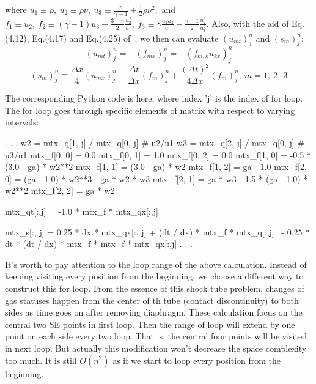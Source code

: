 \documentclass[a4paper,12pt]{article}
\begin{document}
where $u_{1}\equiv\rho,~u_{2}\equiv\rho\nu,~u_{3}\equiv\frac{p}{\gamma -1}
+\frac{1}{2}\rho\nu^{2},$ \newline
and $f_{1}\equiv u_{2},~f_{2}\equiv(\gamma -1)u_{3}+\frac{3-\gamma}{2}
\frac{u^{2}_{2}}{u_{1}},~f_{3}\equiv\gamma\frac{u_{2}u_{3}}{u_{1}}
-\frac{\gamma -1}{2}\frac{u^{3}_{2}}{u^{2}_{1}}$. \newline
Also, with the aid of Eq.(4.12), Eq.(4.17) and Eq.(4.25) 
of~\cite{CESE_Shin_Chung_Chang_1995}, we then can evaluate $(u_{mt})^{n}_{j}$ 
and $(s_{m})^{n}_{j}$:
\begin{equation}
(u_{mt})^{n}_{j} = -(f_{mx})^{n}_{j} = -(f_{m,k}u_{kx})^{n}_{j}
\end{equation}
\begin{equation}
(s_{m})^{n}_{j}\equiv\frac{\Delta x}{4}(u_{mx})^{n}_{j}+\frac{\Delta t}
{\Delta x}(f_{m})^{n}_{j}+\frac{(\Delta t)^{2}}{4\Delta x}(f_{m})^{n}_{j}
,~m=1,~2,~3
\end{equation}

The corresponding Python code is here, where index 'j' is the index of for loop. 
The for loop goes through specific elements of matrix with respect to varying 
intervals:
\begin{pythonNoIndex}
                            .
                            .
                            .
        w2 = mtx_q[1, j] / mtx_q[0, j]  # u2/u1
        w3 = mtx_q[2, j] / mtx_q[0, j]  # u3/u1
        mtx_f[0, 0] = 0.0
        mtx_f[0, 1] = 1.0
        mtx_f[0, 2] = 0.0
        mtx_f[1, 0] = -0.5 * (3.0 - ga) * w2**2
        mtx_f[1, 1] = (3.0 - ga) * w2
        mtx_f[1, 2] = ga - 1.0
        mtx_f[2, 0] = (ga - 1.0) * w2**3 - ga * w2 * w3
        mtx_f[2, 1] = ga * w3 - 1.5 * (ga - 1.0) * w2**2 
        mtx_f[2, 2] = ga * w2

        mtx_qt[:,j] = -1.0 * mtx_f * mtx_qx[:,j]

        mtx_s[:, j] = 0.25 * dx * mtx_qx[:, j] + (dt / dx) * mtx_f * mtx_q[:,j] \
                          - 0.25 * dt * (dt / dx) * mtx_f * mtx_f * mtx_qx[:,j]
                            .
                            .
                            .
\end{pythonNoIndex}

It's worth to pay attention to the loop range of the above calculation. 
Instead of keeping visiting every position from the beginning, we choose a 
different way to construct this for loop. From the essence of this shock tube 
problem, changes of gas statuses happen from the center of th tube (contact 
discontinuity) to both sides as time goes on after removing diaphragm. 
These calculation focus on the central two SE points in first loop. Then the 
range of loop will extend by one point on each side every two loop. That is, 
the central four points will be visited in next loop. But actually this 
modification won't decrease the space complexity too much. It is still 
$O(n^{2})$ as if we start to loop every position from the beginning.
\end{document}
